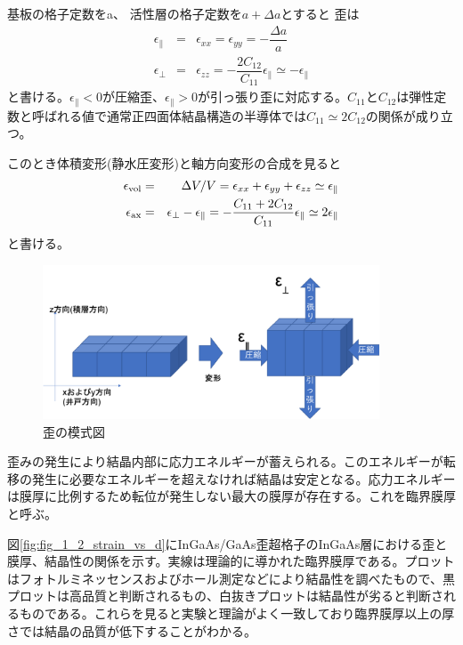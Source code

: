 基板の格子定数をa、 活性層の格子定数を$a+\Delta a$とすると
歪は
\begin{eqnarray}
\epsilon_{\|}&=&\epsilon_{xx}=\epsilon_{yy}=-\dfrac{\Delta a}{a}\\
\epsilon_{\bot}&=&\epsilon_{zz}=-\dfrac{2C_{12}}{C_{11}}\epsilon_{\|}\simeq -\epsilon_{\|}
\end{eqnarray}
と書ける。$\epsilon_{\|}<0$が圧縮歪、$\epsilon_{\|}>0$が引っ張り歪に対応する。$C_{11}$と$C_{12}$は弾性定数と呼ばれる値で通常正四面体結晶構造の半導体では$C_{11}\simeq 2C_{12}$の関係が成り立つ\cite{ref_iga}。


このとき体積変形(静水圧変形)と軸方向変形の合成を見ると
\begin{eqnarray}
\epsilon_{\rm{vol}}&=&\Delta V/V=\epsilon _{xx}+\epsilon _{yy}+\epsilon_{zz}\simeq \epsilon_{\|}\\
\epsilon_{\rm{ax}}&=&\epsilon_{\bot}-\epsilon_{\|}=-\dfrac{C_{11}+2C_{12}}{C_{11}}\epsilon_{\|}\simeq 2\epsilon_{\|}
\end{eqnarray}
と書ける。
\begin{figure}[h]
	\centering
	\includegraphics[width=10cm]{figure/fig_1_1_lattice_strain02.png}
	\caption{歪の模式図}
	\label{fig:fig_lattice_strain02}
\end{figure}
歪みの発生により結晶内部に応力エネルギーが蓄えられる。このエネルギーが転移の発生に必要なエネルギーを超えなければ結晶は安定となる。応力エネルギーは膜厚に比例するため転位が発生しない最大の膜厚が存在する。これを臨界膜厚と呼ぶ。

図\ref{fig:fig_1_2_strain_vs_d}にInGaAs/GaAs歪超格子のInGaAs層における歪と膜厚、結晶性の関係を示す\cite{ref_konagai}。実線は理論的に導かれた臨界膜厚である。プロットはフォトルミネッセンスおよびホール測定などにより結晶性を調べたもので、黒プロットは高品質と判断されるもの、白抜きプロットは結晶性が劣ると判断されるものである。これらを見ると実験と理論がよく一致しており臨界膜厚以上の厚さでは結晶の品質が低下することがわかる。

